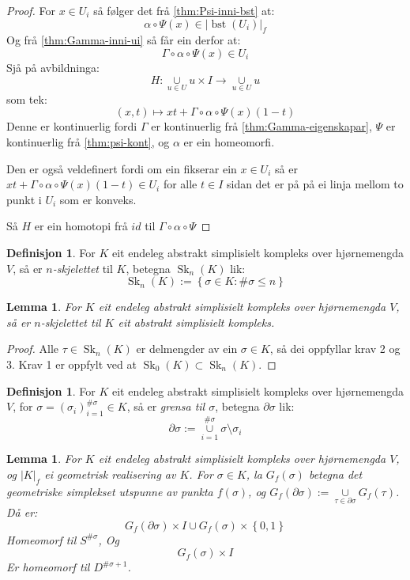 \documentclass[a4paper, titlepage, 12pt, norsk]{article}
\theoremstyle{plain}
\newtheorem{lemma}[theorem]{Lemma}
\theoremstyle{definition}
\newtheorem{definition}[theorem]{Definisjon}
\newcommand{\union}{ \mathop{\cup}\limits }
\newcommand{\gr}[1]{ \lvert #1 \rvert } %
\newcommand{\set}[1]{ \left \{ #1 \right \} } %
\newcommand{\tuple}[1]{ \left( #1 \right) } %
\DeclareMathOperator{\bst}{bst}
\DeclareMathOperator{\Sk}{Sk}
\begin{document}
\begin{proof} %
	For \( x \in U_i \) så følger det frå \autoref{thm:Psi-inni-bst} at:
	\[
		\alpha \circ \Psi(x) \in \gr{\bst(U_i)}_f
	\]
	Og frå \autoref{thm:Gamma-inni-ui} så får ein derfor at:
	\[
		\Gamma \circ \alpha \circ \Psi(x) \in U_i
	\]
	Sjå på avbildninga:
	\[
		H: \union_{u \in U} u \times I \to \union_{u \in U} u
	\]
	som tek:
	\[
		\tuple{x, t} \mapsto xt + \Gamma \circ \alpha \circ \Psi(x)(1-t)
	\]
	Denne er kontinuerlig fordi \( \Gamma \) er kontinuerlig frå \autoref{thm:Gamma-eigenskapar}, \( \Psi \) er kontinuerlig frå \autoref{thm:psi-kont}, og \( \alpha \) er ein homeomorfi.
	
	Den er også veldefinert fordi om ein fikserar ein \( x \in U_i \) så er \( xt + \Gamma \circ \alpha \circ \Psi(x)(1-t) \in U_i \) for alle \( t \in I \) sidan det er på på ei linja mellom to punkt i \( U_i \) som er konveks.

	Så \( H \) er ein homotopi frå \( id \) til \( \Gamma \circ \alpha \circ \Psi \)
\end{proof}

\begin{definition}
	For \( K \) eit endeleg abstrakt simplisielt kompleks over hjørnemengda \( V \), så er \emph{\( n \)-skjelettet} til \( K \), betegna \( \Sk_n(K) \) lik:
	\[
		\Sk_n(K) := \set{\sigma \in K : \#\sigma \leq n}
	\]
\end{definition}

\begin{lemma}
	For \( K \) eit endeleg abstrakt simplisielt kompleks over hjørnemengda \( V \), så er \( n \)-skjelettet til \( K \) eit abstrakt simplisielt kompleks.
\end{lemma}

\begin{proof}
	Alle \( \tau \in \Sk_n(K) \) er delmengder av ein \( \sigma \in K \), så dei oppfyllar krav 2 og 3. Krav 1 er oppfylt ved at \( \Sk_0(K) \subset \Sk_n(K) \).
\end{proof}

\begin{definition}
	For \( K \) eit endeleg abstrakt simplisielt kompleks over hjørnemengda \( V \), for \( \sigma = \tuple{\sigma_i}_{i=1}^{\#\sigma} \in K \), så er \emph{grensa til \( \sigma \)}, betegna \( \partial\sigma \) lik:
	\[
		\partial\sigma := \union_{i = 1}^{\#\sigma} \sigma \setminus \sigma_i 
	\]
\end{definition}

\begin{lemma}
	For \( K \) eit endeleg abstrakt simplisielt kompleks over hjørnemengda \( V \), og \( \gr{K}_f \) ei geometrisk realisering av \( K \). For \( \sigma \in K \), la \( G_f(\sigma) \) betegna det geometriske simplekset utspunne av punkta \( f(\sigma) \), og \( G_f(\partial\sigma) := \union_{\tau \in \partial\sigma} G_f(\tau) \). Då er:
	\[
		G_f(\partial\sigma) \times I \union G_f(\sigma) \times \set{0, 1}
	\] 
	Homeomorf til \( S^{\#\sigma} \), Og
	\[
		G_f(\sigma) \times I
	\] 
	Er homeomorf til \( D^{\#\sigma+1} \).
\end{lemma}
\end{document}
